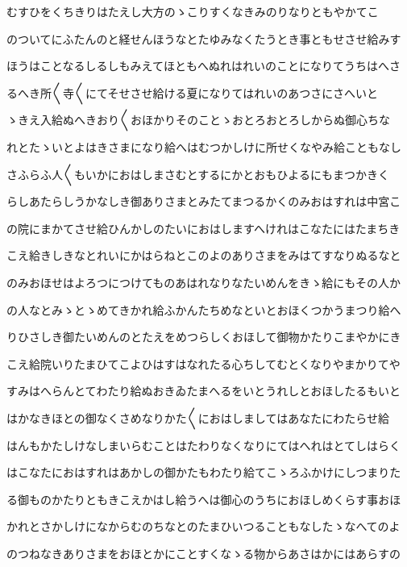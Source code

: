 \documentclass[a4paper,11pt,landscape]{ltjtarticle}
\begin{document}
\par\medskip
むすひをくちきりはたえし大方のゝこりすくなきみのりなりともやかてこ
\par\medskip
のついてにふたんのと経せんほうなとたゆみなくたうとき事ともせさせ給みす
\par\medskip
ほうはことなるしるしもみえてほともへぬれはれいのことになりてうちはへさ
\par\medskip
るへき所〱寺〱にてそせさせ給ける夏になりてはれいのあつさにさへいと
\par\medskip
ゝきえ入給ぬへきおり〱おほかりそのことゝおとろおとろしからぬ御心ちな
\par\medskip
れとたゝいとよはきさまになり給へはむつかしけに所せくなやみ給こともなし
\par\medskip
さふらふ人〱もいかにおはしまさむとするにかとおもひよるにもまつかきく
\par\medskip
らしあたらしうかなしき御ありさまとみたてまつるかくのみおはすれは中宮こ
\par\medskip
の院にまかてさせ給ひんかしのたいにおはしますへけれはこなたにはたまちき
\par\medskip
こえ給きしきなとれいにかはらねとこのよのありさまをみはてすなりぬるなと
\par\medskip
のみおほせはよろつにつけてものあはれなりなたいめんをきゝ給にもその人か
\par\medskip
の人なとみゝとゝめてきかれ給ふかんたちめなといとおほくつかうまつり給へ
\par\medskip
りひさしき御たいめんのとたえをめつらしくおほして御物かたりこまやかにき
\par\medskip
こえ給院いりたまひてこよひはすはなれたる心ちしてむとくなりやまかりてや
\par\medskip
すみはへらんとてわたり給ぬおきゐたまへるをいとうれしとおほしたるもいと
\par\medskip
はかなきほとの御なくさめなりかた〱におはしましてはあなたにわたらせ給
\par\medskip
はんもかたしけなしまいらむことはたわりなくなりにてはへれはとてしはらく
\par\medskip
はこなたにおはすれはあかしの御かたもわたり給てこゝろふかけにしつまりた
\par\medskip
る御ものかたりともきこえかはし給うへは御心のうちにおほしめくらす事おほ
\par\medskip
かれとさかしけになからむのちなとのたまひいつることもなしたゝなへてのよ
\par\medskip
のつねなきありさまをおほとかにことすくなゝる物からあさはかにはあらすの
\par\medskip
\end{document}
